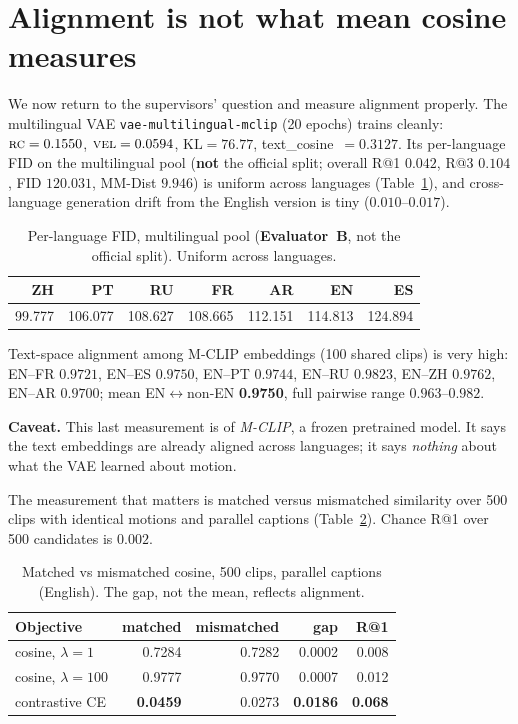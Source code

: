 \documentclass[11pt,a4paper]{report}
\newcommand{\rc}{\textsc{rc}}
\newcommand{\vel}{\textsc{vel}}
\newcommand{\best}[1]{\textbf{#1}}
\newcommand{\callout}[1]{\begin{calloutenv}\small #1\end{calloutenv}}
\begin{document}
\section{Alignment is not what mean cosine measures}
\label{sec:cosine-fails}

We now return to the supervisors' question and measure alignment properly.
The multilingual VAE \texttt{vae-multilingual-mclip} (20 epochs) trains
cleanly: $\rc=0.1550$, $\vel=0.0594$, $\mathrm{KL}=76.77$,
text\_cosine~$=0.3127$. Its per-language FID on the multilingual pool
(\textbf{not} the official split; overall R@1 $0.042$, R@3 $0.104$, FID
$120.031$, MM-Dist $9.946$) is uniform across languages
(Table~\ref{tab:perlang-fid}), and cross-language generation drift from the
English version is tiny ($0.010$--$0.017$).

\begin{table}[H]
\centering
\caption{Per-language FID, multilingual pool (\textbf{Evaluator~B}, not the
official split). Uniform across languages.}
\label{tab:perlang-fid}
\small
\begin{tabular}{@{}rrrrrrr@{}}
\toprule
ZH & PT & RU & FR & AR & EN & ES \\
\midrule
99.777 & 106.077 & 108.627 & 108.665 & 112.151 & 114.813 & 124.894 \\
\bottomrule
\end{tabular}
\end{table}

Text-space alignment among M-CLIP embeddings (100 shared clips) is very
high: EN--FR $0.9721$, EN--ES $0.9750$, EN--PT $0.9744$, EN--RU $0.9823$,
EN--ZH $0.9762$, EN--AR $0.9700$; mean EN$\leftrightarrow$non-EN
\textbf{0.9750}, full pairwise range $0.963$--$0.982$.

\callout{\textbf{Caveat.} This last measurement is of \emph{M-CLIP}, a
frozen pretrained model. It says the text embeddings are already aligned
across languages; it says \emph{nothing} about what the VAE learned about
motion.}

The measurement that matters is matched versus mismatched similarity over
500 clips with identical motions and parallel captions
(Table~\ref{tab:matched}). Chance R@1 over 500 candidates is $0.002$.

\begin{table}[H]
\centering
\caption{Matched vs mismatched cosine, 500 clips, parallel captions
(English). The gap, not the mean, reflects alignment.}
\label{tab:matched}
\small
\begin{tabular}{@{}lrrrr@{}}
\toprule
Objective & matched & mismatched & \textbf{gap} & R@1 \\
\midrule
cosine, $\lambda=1$   & 0.7284 & 0.7282 & 0.0002 & 0.008 \\
cosine, $\lambda=100$ & 0.9777 & 0.9770 & 0.0007 & 0.012 \\
contrastive CE        & \best{0.0459} & 0.0273 & \best{0.0186} & \best{0.068} \\
\bottomrule
\end{tabular}
\end{table}
\end{document}
